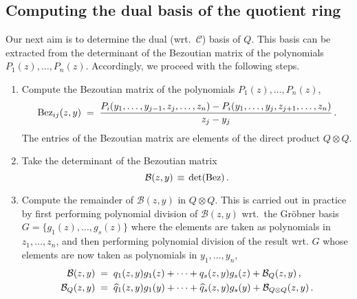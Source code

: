\documentclass[dvipsnames,preprint,12pt,sort&compress]{elsarticle}
\begin{document}
\subsection{Computing the dual basis of the quotient ring}

Our next aim is to determine the dual (wrt.~$\mathcal{C}$) basis of $Q$.
This basis can be extracted from the determinant of the Bezoutian matrix
of the polynomials $P_1 (z), \ldots, P_n (z)$.
Accordingly, we proceed with the following steps.

\begin{enumerate}
\item Compute the Bezoutian matrix of the polynomials $P_1 (z), \ldots, P_n (z)$,
\begin{equation}
\mathrm{Bez}_{ij} (z,y) \hspace{1mm}=\hspace{1mm} \frac{P_i (y_1, \ldots, y_{j-1}, z_j, \ldots, z_n) - P_i (y_1, \ldots, y_j, z_{j+1}, \ldots, z_n)}{z_j - y_j} \,.
\label{eq:Bezoutian_matrix_definition}
\end{equation}
The entries of the Bezoutian matrix are elements of the direct product $Q \otimes Q$.

\item Take the determinant of the Bezoutian matrix
\begin{equation}
\mathcal{B} (z, y) \hspace{0.5mm}\equiv\hspace{0.5mm} \det (\mathrm{Bez}) \,.
\label{eq:Bezoutian_determinant_definition}
\end{equation}

\item Compute the remainder of $\mathcal{B} (z, y)$ in $Q \otimes Q$.
This is carried out in practice by first performing polynomial division of $\mathcal{B} (z, y)$
wrt.~the Gr{\"o}bner basis
$G = \{ g_1(z), \ldots, g_s(z)\}$ where
the elements are taken as polynomials in $z_1, \ldots, z_n$, and then
performing polynomial division of the result wrt. $G$ whose elements are now taken as polynomials in $y_1, \ldots, y_n$,
\begin{align}
\mathcal{B} (z, y)   \hspace{1mm} \label{eq:pol_div_of_Bez_wrt_z}
&=\hspace{1mm} q_1 (z,y) g_1 (z) + \cdots + q_s (z,y) g_s (z) + \mathcal{B}_Q (z, y) \,, \\
\mathcal{B}_Q (z, y) \hspace{1mm}&=\hspace{1mm} \widehat{q}_1 (z,y) g_1 (y) + \cdots + \widehat{q}_s (z,y) g_s (y) + \mathcal{B}_{Q \otimes Q} (z, y) \,. \label{eq:pol_div_of_Bez_wrt_y}
\end{align}


\end{enumerate}
\end{document}
